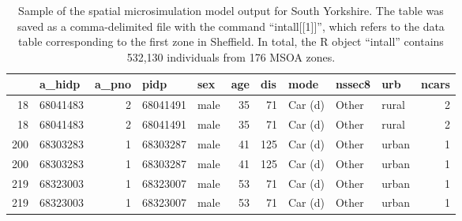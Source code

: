 \documentclass[a4paper, 11pt, twoside]{Thesis}
\begin{document}
\begin{table}[htbp]
\caption[Sample of the spatial microsimulation model output]
{Sample of the spatial microsimulation model output for South
Yorkshire. The table was saved as a comma-delimited file with the command
``intall[[1]]'', which refers to the data table corresponding to the
first zone in Sheffield. In total, the R object
``intall'' contains 532,130 individuals from 176 MSOA zones.}
\begin{tabular}{rrrrlrrlllr}
\toprule
\multicolumn{1}{l}{} & \multicolumn{1}{l}{a\_hidp} & \multicolumn{1}{l}{a\_pno} &
\multicolumn{1}{l}{pidp} & sex & \multicolumn{1}{l}{age} & \multicolumn{1}{l}{dis}
& mode & nssec8 & urb & \multicolumn{1}{l}{ncars} \\
\midrule
18 & 68041483 & 2 & 68041491 & male & 35 & 71 & Car (d) & Other & rural & 2 \\
18 & 68041483 & 2 & 68041491 & male & 35 & 71 & Car (d) & Other & rural & 2 \\
200 & 68303283 & 1 & 68303287 & male & 41 & 125 & Car (d) & Other & urban & 1 \\
200 & 68303283 & 1 & 68303287 & male & 41 & 125 & Car (d) & Other & urban & 1 \\
219 & 68323003 & 1 & 68323007 & male & 53 & 71 & Car (d) & Other & urban & 1 \\
219 & 68323003 & 1 & 68323007 & male & 53 & 71 & Car (d) & Other & urban & 1 \\
\bottomrule
\end{tabular}
\label{tintallh}
\end{table}
\end{document}
